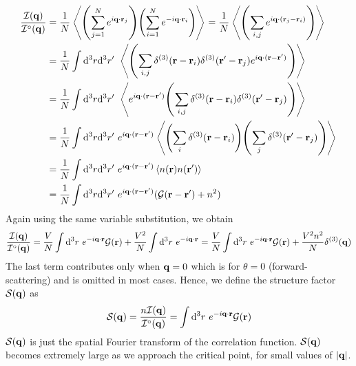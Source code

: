 \begin{align*}
    \frac{\mathcal{I}(\vb{q})}{\tensor*{\mathcal{I}}{^\circ}(\vb{q})} &=\frac{1}{N}\avg{\qty(\sum\limits_{j=1}^N  e^{i\vb{q}\cdot \vb{r}_j})\qty(\sum\limits_{i=1}^N  e^{-i\vb{q}\cdot \vb{r}_i})} =\frac{1}{N}\avg{\qty(\sum\limits_{i,j}  e^{i\vb{q}\cdot (\vb{r}_j-\vb{r}_i)})}\\
    &=\frac{1}{N}\int \dd^3r\dd^3r'\ \avg{\qty(\sum\limits_{i,j}\ddelt{\vb{r}-\vb{r}_i}\ddelt{\vb{r}'-\vb{r}_j}  e^{i\vb{q}\cdot (\vb{r}-\vb{r}')})}\\
    &=\frac{1}{N}\int \dd^3r\dd^3r'\ \avg{ e^{i\vb{q}\cdot (\vb{r}-\vb{r}')} \qty(\sum\limits_{i,j}\ddelt{\vb{r}-\vb{r}_i}\ddelt{\vb{r}'-\vb{r}_j})}\\
    &=\frac{1}{N}\int \dd^3r\dd^3r'\ e^{i\vb{q}\cdot (\vb{r}-\vb{r}')} \avg{  \qty(\sum\limits_{i}\ddelt{\vb{r}-\vb{r}_i})\qty(\sum\limits_j\ddelt{\vb{r}'-\vb{r}_j})}\\
    &=\frac{1}{N}\int \dd^3r\dd^3r'\ e^{i\vb{q}\cdot (\vb{r}-\vb{r}')} \avg{ n(\vb{r})n(\vb{r}')}\\
    &=\frac{1}{N}\int \dd^3r\dd^3r'\ e^{i\vb{q}\cdot (\vb{r}-\vb{r}')} (\SG(\vb{r}-\vb{r}')+n^2)\\
\end{align*}
Again using the same variable substitution, we obtain 
$$\frac{\mathcal{I}(\vb{q})}{\tensor*{\mathcal{I}}{^\circ}(\vb{q})} = \frac{V}{N}\int \dd^3 r\ e^{-i\vb{q}\cdot \vb{r}} \SG(\vb{r}) +\frac{V^2}{N}\int \dd^3 r \ e^{-i\vb{q}\cdot \vb{r}} = \frac{V}{N}\int \dd^3 r\ e^{-i\vb{q}\cdot \vb{r}} \SG(\vb{r}) +\frac{V^2n^2}{N}\ddelt{\vb{q}}$$
The last term contributes only when $\vb{q} =0$ which is for $\theta=0$ (forward-scattering) and is omitted in most cases. Hence, we define the structure factor $\mathcal S(\vb{q})$ as 
$$\Ss(\vb{q}) = \frac{n\mathcal{I}(\vb{q})}{\tensor*{\mathcal{I}}{^\circ}(\vb{q})} = \int \dd^3 r\ e^{-i\vb{q}\cdot \vb{r}} \SG(\vb{r})$$
$\mathcal S(\vb{q})$ is just the spatial Fourier transform of the correlation function. $\mathcal S(\vb{q})$ becomes extremely large as we approach the critical point, for small values of $\abs{\vb{q}}$. 